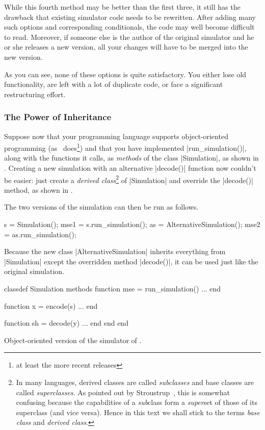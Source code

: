 \begin{enumerate}
    While this fourth method may be better than the first three, it still has
    the drawback that existing simulator code needs to be rewritten.  After
    adding many such options and corresponding conditionals, the code may well
    become difficult to read. Moreover, if someone else is the author of the
    original simulator and he or she releases a new version, all your changes
    will have to be merged into the new version. 
\end{enumerate}

As you can see, none of these options is quite satisfactory. You either lose old
functionality, are left with a lot of duplicate code, or face a significant
restructuring effort.


\subsubsection{The Power of Inheritance}

Suppose now that your programming language supports object-oriented programming
(as \matlab\ does\footnote{at least the more recent releases})
and that you have implemented |run_simulation()|, along with the functions it
calls, as \emph{methods} of the class |Simulation|, as shown in
. Creating a new simulation with an alternative |decode()|
function now couldn't be easier: just create a \emph{derived class}\footnote{In
many languages, derived classes are called \emph{subclasses} and base classes
are called \emph{superclasses}. As pointed out by
Stroustrup~\cite[]{Stroustrup1997}, this is somewhat confusing because
the capabilities of a \emph{sub}class form a \emph{super}set of those of its
superclass (and vice versa). Hence in this text we shall stick to the terms
\emph{base class} and \emph{derived class}.} of |Simulation| and override the
|decode()| method, as shown in . 

The two versions of the simulation can then be run as follows.
\begin{Code}
  s = Simulation();              %
  mse1 = s.run_simulation();     %
  as = AlternativeSimulation();  %
  mse2 = as.run_simulation();    %
\end{Code}
Because the new class |AlternativeSimulation| inherits everything from
|Simulation| except the overridden method |decode()|, it can be used just like
the original simulation.

\begin{listing}
\begin{Code}
  classdef Simulation
    methods
      function mse = run_simulation()
        ... %
      end

      function x = encode(s)
        ...
      end

      function sh = decode(y)
        ...
      end
    end
  end
\end{Code}
  \caption{Object-oriented version of the simulator of .}
  \label{lst:objectsim}
\end{listing}

